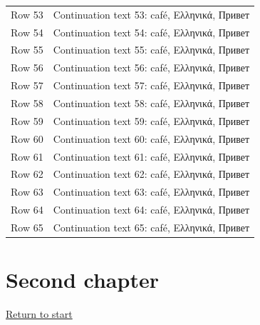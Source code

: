 \documentclass{article}
\begin{document}
\begin{longtable}{>{\raggedright\arraybackslash}p{}>{\raggedright\arraybackslash}p{}}
Row 53\par  & Continuation text 53: café, Ελληνικά, Привет\par  \\
Row 54\par  & Continuation text 54: café, Ελληνικά, Привет\par  \\
Row 55\par  & Continuation text 55: café, Ελληνικά, Привет\par  \\
Row 56\par  & Continuation text 56: café, Ελληνικά, Привет\par  \\
Row 57\par  & Continuation text 57: café, Ελληνικά, Привет\par  \\
Row 58\par  & Continuation text 58: café, Ελληνικά, Привет\par  \\
Row 59\par  & Continuation text 59: café, Ελληνικά, Привет\par  \\
Row 60\par  & Continuation text 60: café, Ελληνικά, Привет\par  \\
Row 61\par  & Continuation text 61: café, Ελληνικά, Привет\par  \\
Row 62\par  & Continuation text 62: café, Ελληνικά, Привет\par  \\
Row 63\par  & Continuation text 63: café, Ελληνικά, Привет\par  \\
Row 64\par  & Continuation text 64: café, Ελληνικά, Привет\par  \\
Row 65\par  & Continuation text 65: café, Ελληνικά, Привет\par  \\
\end{longtable}

\section{Second chapter}\label{pc-73-65-63-6f-6e-64}

\hyperref[pc-73-74-61-72-74]{Return to start}
\end{document}
